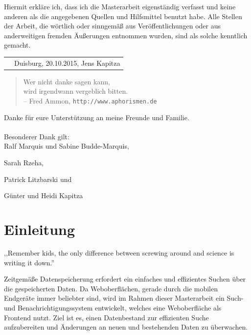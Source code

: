 \documentclass[oneside, ngerman, toc=bibliography,bibliography=totoc,listof=entryprefix, open=right,numbers=noenddot,fontsize=12pt]{scrbook}
\newcommand{\autor}{Jens Kapitza}
\newcommand{\ort}{Duisburg}
\newcommand{\einreichung}{20.10.2015}
\newcommand\chapmd[2]{\begin{mdframed}[%
		rightline=false,leftline=false,topline=false,bottomline=false,frametitlerule=false,
		userdefinedwidth=\textwidth,frametitlealignment=\flushright, %
		frametitlerulecolor=black,frametitle={\small #1}]
		\flushright{} \footnotesize{} #2
	\end{mdframed}}
\begin{document}
\vspace*{\fill}

\noindent Hiermit erkläre ich, dass ich die Masterarbeit eigenständig verfasst und keine anderen
als die angegebenen Quellen und Hilfsmittel benutzt habe.
Alle Stellen der Arbeit, die wörtlich oder sinngemäß aus \mbox{Veröffentlichungen} oder aus anderweitigen
fremden Äußerungen entnommen wurden, sind als solche kenntlich gemacht.

\vspace{30mm}


\begin{tabularx}{\linewidth}{Xr}\cline{2-2}
& \ort{}, \einreichung{}, \autor{}
\end{tabularx}


\cleardoublepage
\vspace*{3cm}
\begin{quote}\Large
\centering
    Wer nicht danke sagen kann,\\wird irgendwann vergeblich bitten.\\
    {\small -- Fred Ammon,  \verb|http://www.aphorismen.de| }
\end{quote}
\vspace*{3cm}
\noindent
Danke für eure Unterstützung an meine Freunde und Familie. \\ \bigskip \\
Besonderer Dank gilt: \\

Ralf Marquis und Sabine Budde-Marquis,

Sarah Rzeha,

Patrick Litzbarski und 

Günter und Heidi Kapitza

\pagebreak


\tableofcontents{}

\mainmatter{}


\chapter{Einleitung}
\label{chap:einleitung}
\chapmd{Facebookseite der MythBusters (26.09.2013)}{,,Remember kids, the only difference between screwing around and science is writing it down.''}

Zeitgemäße Datenspeicherung erfordert ein einfaches und effizientes Suchen über die gespeicherten Daten. Da Weboberflächen, gerade durch die mobilen Endgeräte immer beliebter sind, wird im Rahmen dieser Masterarbeit ein Such- und Benachrichtigungssystem entwickelt, welches eine Weboberfläche als Frontend nutzt. Ziel ist es, einen Datenbestand zur effizienten Suche aufzubereiten und Änderungen an neuen und bestehenden Daten zu überwachen.
\end{document}
